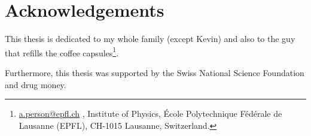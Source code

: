 \Clear
\chapter*{Acknowledgements}
\label{cha:acknowledgements}

\newcommand\email[1]{
	\href{mailto:#1}{#1}
}

This thesis is dedicated to my whole family (except Kevin) and also to the guy that refills the coffee capsules\footnote{\email{a.person@epfl.ch}, Institute of Physics, École Polytechnique Fédérale de Lausanne (EPFL), CH-1015 Lausanne, Switzerland.}.

Furthermore, this thesis was supported by the Swiss National Science Foundation and drug money.

